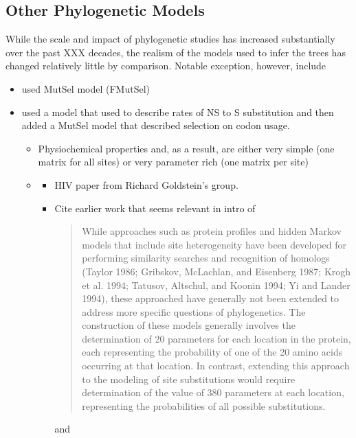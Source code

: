 \begin{itemize}
\section*{Other Phylogenetic Models}
While the scale and impact of phylogenetic studies has increased substantially over the past XXX decades, the realism of the models used to infer the trees has changed relatively little by comparison.
Notable exception, however, include
\begin{itemize}
\item \citet{MuseAndGaut1994,HalpernAndBruno1998,YangAndNielsen2008} used MutSel model (FMutSel) 
\item \citet{YangAndNielsen2008} used a model that used \citet{GoldmanAndYang1994} to describe rates of NS to S substitution and then added a MutSel model that described selection on codon usage.
  \begin{itemize}
  \item Physiochemical properties and, as a result, are either very simple (one matrix for all sites) or very parameter rich (one matrix per site) \citet{RodrigueEtAl2005} 
  \item \citet{KoshiEtAl1997,KoshiEtAl1999,DimmicEtAl2000}
    \begin{itemize}
    \item HIV paper from Richard Goldstein's group.
    \item Cite earlier work that seems relevant in intro of \citet{KoshiEtAl1999}
      \begin{quote}
        While approaches such as protein profiles and hidden Markov models that include site heterogeneity have been developed for performing similarity searches and recognition of homologs (Taylor 1986; Gribskov, McLachlan, and Eisenberg 1987; Krogh et al. 1994; Tatusov, Altschul, and Koonin 1994; Yi and Lander 1994), these approached have generally not been extended to address more specific questions of phylogenetics. The construction of these models generally involves the determination of 20 parameters for each location in the protein, each representing the probability of one of the 20 amino acids occurring at that location. In contrast, extending this approach to the modeling of site substitutions would require determination of the value of 380 parameters at each location, representing the probabilities of all possible substitutions.
      \end{quote}
      and
      \begin{quote}

\end{quote}
\end{itemize}
\end{itemize}
\end{itemize}
\end{itemize}
